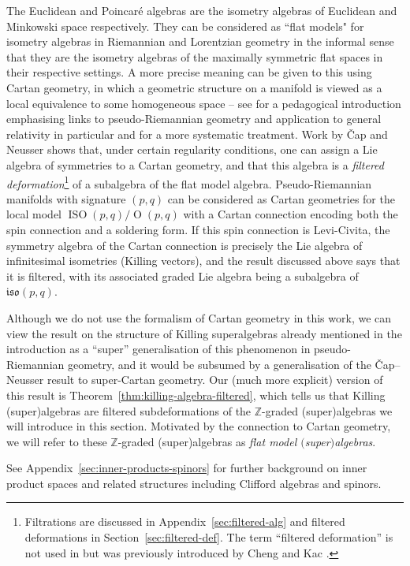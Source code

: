 \documentclass[10pt,a4paper]{amsart}
\numberwithin{equation}{section}
\newcommand{\fiso}{\mathfrak{iso}}
\newcommand{\ZZ}{\mathbb{Z}}
\newcommand{\1}{\mathbbm{1}}
\DeclareMathOperator{\Orth}{O}
\DeclareMathOperator{\ISO}{ISO}
\begin{document}
The Euclidean and Poincar\'e algebras are the isometry algebras of Euclidean and Minkowski space respectively. They can be considered as ``flat models" for isometry algebras in Riemannian and Lorentzian geometry in the informal sense that they are the isometry algebras of the maximally symmetric flat spaces in their respective settings. A more precise meaning can be given to this using Cartan geometry, in which a geometric structure on a manifold is viewed as a local equivalence to some homogeneous space -- see \cite{Wise2010} for a pedagogical introduction emphasising links to pseudo-Riemannian geometry and application to general relativity in particular and \cite{Cap2009_1} for a more systematic treatment. Work by \v{C}ap and Neusser \cite{Cap2009} shows that, under certain regularity conditions, one can assign a Lie algebra of symmetries to a Cartan geometry, and that this algebra is a \emph{filtered deformation}\footnote{Filtrations are discussed in Appendix~\ref{sec:filtered-alg} and filtered deformations in Section~\ref{sec:filtered-def}. The term ``filtered deformation'' is not used in \cite{Cap2009} but was previously introduced by Cheng and Kac \cite{Cheng1998}.}
of a subalgebra of the flat model algebra. Pseudo-Riemannian manifolds with signature $(p,q)$ can be considered as Cartan geometries for the local model $\ISO(p,q)/\Orth(p,q)$ with a Cartan connection encoding both the spin connection and a soldering form. If this spin connection is Levi-Civita, the symmetry algebra of the Cartan connection is precisely the Lie algebra of infinitesimal isometries (Killing vectors), and the result discussed above says that it is filtered, with its associated graded Lie algebra being a subalgebra of $\fiso(p,q)$.

Although we do not use the formalism of Cartan geometry in this work, we can view the result on the structure of Killing superalgebras already mentioned in the introduction as a ``super'' generalisation of this phenomenon in pseudo-Riemannian geometry, and it would be subsumed by a generalisation of the \v{C}ap--Neusser result \cite{Cap2009} to super-Cartan geometry. Our (much more explicit) version of this result is Theorem~\ref{thm:killing-algebra-filtered}, which tells us that Killing (super)algebras are filtered subdeformations of the $\ZZ$-graded (super)algebras we will introduce in this section. Motivated by the connection to Cartan geometry, we will refer to these $\ZZ$-graded (super)algebras as \emph{flat model $($super$)$algebras}.

See Appendix~\ref{sec:inner-products-spinors} for further background on inner product spaces and related structures including Clifford algebras and spinors.
\end{document}
